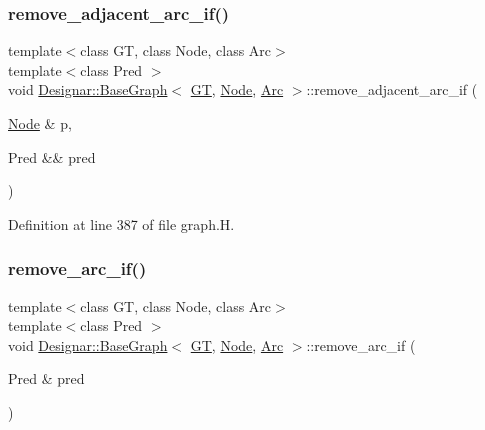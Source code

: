\subsubsection{\texorpdfstring{remove\+\_\+adjacent\+\_\+arc\+\_\+if()}{remove\_adjacent\_arc\_if()}\hspace{0.1cm}{\footnotesize\ttfamily [2/2]}}
{\footnotesize\ttfamily template$<$class GT, class Node, class Arc$>$ \\
template$<$class Pred $>$ \\
void \hyperlink{class_designar_1_1_base_graph}{Designar\+::\+Base\+Graph}$<$ \hyperlink{demo-buildgraph_8_c_a3001c40d2c31ca87ed96cd7d1334a55e}{GT}, \hyperlink{namespace_designar_a5af326c65aa2bd26b26c410f2030d09e}{Node}, \hyperlink{namespace_designar_a3f55fb5513d62ff47cbc8f72b8e95d6f}{Arc} $>$\+::remove\+\_\+adjacent\+\_\+arc\+\_\+if (\begin{DoxyParamCaption}\item[{\hyperlink{namespace_designar_a5af326c65aa2bd26b26c410f2030d09e}{Node} \&}]{p,  }\item[{Pred \&\&}]{pred }\end{DoxyParamCaption})\hspace{0.3cm}{\ttfamily [inline]}}



Definition at line 387 of file graph.\+H.

\mbox{\label{class_designar_1_1_base_graph_a9c97f2759a2847e61e17dc2806172758}} 
\subsubsection{\texorpdfstring{remove\+\_\+arc\+\_\+if()}{remove\_arc\_if()}\hspace{0.1cm}{\footnotesize\ttfamily [1/2]}}
{\footnotesize\ttfamily template$<$class GT, class Node, class Arc$>$ \\
template$<$class Pred $>$ \\
void \hyperlink{class_designar_1_1_base_graph}{Designar\+::\+Base\+Graph}$<$ \hyperlink{demo-buildgraph_8_c_a3001c40d2c31ca87ed96cd7d1334a55e}{GT}, \hyperlink{namespace_designar_a5af326c65aa2bd26b26c410f2030d09e}{Node}, \hyperlink{namespace_designar_a3f55fb5513d62ff47cbc8f72b8e95d6f}{Arc} $>$\+::remove\+\_\+arc\+\_\+if (\begin{DoxyParamCaption}\item[{Pred \&}]{pred }\end{DoxyParamCaption})\hspace{0.3cm}{\ttfamily [inline]}}



